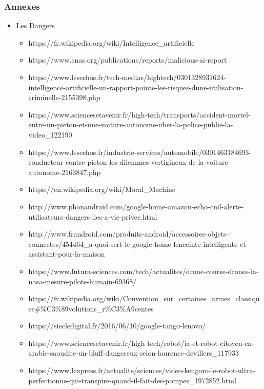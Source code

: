 \documentclass{beamer}
\begin{document}
	\begin{frame}
	\frametitle{Annexes}
	\begin{itemize}
	\itemsep1em
		\item Les Dangers
		\begin{itemize}
		\itemsep1em
			\item https://fr.wikipedia.org/wiki/Intelligence\_artificielle
			\item https://www.cnas.org/publications/reports/malicious-ai-report
			\item https://www.lesechos.fr/tech-medias/hightech/0301328931624-intelligence-artificielle-un-rapport-pointe-les-risques-dune-utilisation-criminelle-2155398.php
			\item https://www.sciencesetavenir.fr/high-tech/transports/accident-mortel-entre-un-pieton-et-une-voiture-autonome-uber-la-police-publie-la-video\_122190
			\item https://www.lesechos.fr/industrie-services/automobile/0301463184693-conducteur-contre-pieton-les-dilemmes-vertigineux-de-la-voiture-autonome-2163847.php
			\item https://en.wikipedia.org/wiki/Moral\_Machine
			\item http://www.phonandroid.com/google-home-amazon-echo-cnil-alerte-utilisateurs-dangers-lies-a-vie-privee.html
			\item http://www.frandroid.com/produits-android/accessoires-objets-connectes/454464\_a-quoi-sert-le-google-home-lenceinte-intelligente-et-assistant-pour-la-maison
			\item https://www.futura-sciences.com/tech/actualites/drone-course-drones-ia-nasa-mesure-pilote-humain-69368/
			\item https://fr.wikipedia.org/wiki/Convention\_sur\_certaines\_armes\_classiques\#\%C3\%89volutions\_r\%C3\%A9centes
			\item https://siecledigital.fr/2016/06/10/google-tango-lenovo/
			\item https://www.sciencesetavenir.fr/high-tech/robot/ia-et-robot-citoyen-en-arabie-saoudite-un-bluff-dangereux-selon-laurence-devillers\_117933
			\item https://www.lexpress.fr/actualite/sciences/video-kengoro-le-robot-ultra-perfectionne-qui-transpire-quand-il-fait-des-pompes\_1972852.html
		\end{itemize}
		\end{itemize}
	\end{frame}
	
\end{document}
